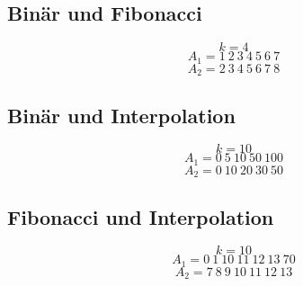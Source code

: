 \documentclass[10pt,a4paper]{article}
\begin{document}
\subsection{Binär und Fibonacci}
\begin{equation}
  k = 4
\end{equation}
\begin{equation}
  A_{1} = 1\ 2\ 3\ 4\ 5\ 6\ 7
\end{equation}
\begin{equation}
  A_{2} = 2\ 3\ 4\ 5\ 6\ 7\ 8
\end{equation}

\subsection{Binär und Interpolation}
\begin{equation}
  k = 10
\end{equation}
\begin{equation}
  A_{1} = 0\ 5\ 10\ 50\ 100
\end{equation}
\begin{equation}
  A_{2} = 0\ 10\ 20\ 30\ 50
\end{equation}

\subsection{Fibonacci und Interpolation}
\begin{equation}
  k = 10
\end{equation}
\begin{equation}
  A_{1} = 0\ 1\ 10\ 11\ 12\ 13\ 70
\end{equation}
\begin{equation}
  A_{2} = 7\ 8\ 9\ 10\ 11\ 12\ 13
\end{equation}
\end{document}
